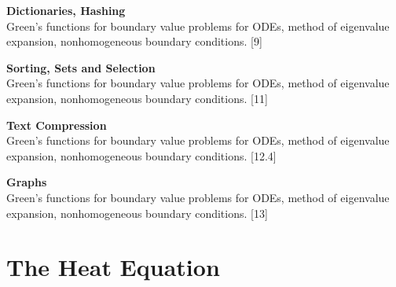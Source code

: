 \documentclass{article}
\begin{document}
{  \vspace{10pt}
  \noindent\textbf{Dictionaries, Hashing}\\
  Green's functions for boundary value problems for ODEs, method of eigenvalue expansion, nonhomogeneous boundary conditions.\hspace*{\fill} [9]

  \vspace{10pt}
  \noindent\textbf{Sorting, Sets and Selection}\\
  Green's functions for boundary value problems for ODEs, method of eigenvalue expansion, nonhomogeneous boundary conditions.\hspace*{\fill} [11]

  \vspace{10pt}
  \noindent\textbf{Text Compression}\\
  Green's functions for boundary value problems for ODEs, method of eigenvalue expansion, nonhomogeneous boundary conditions.\hspace*{\fill} [12.4]

  \vspace{10pt}
  \noindent\textbf{Graphs}\\
  Green's functions for boundary value problems for ODEs, method of eigenvalue expansion, nonhomogeneous boundary conditions.\hspace*{\fill} [13]
  }

\tableofcontents


	\section{The Heat Equation}
\end{document}

